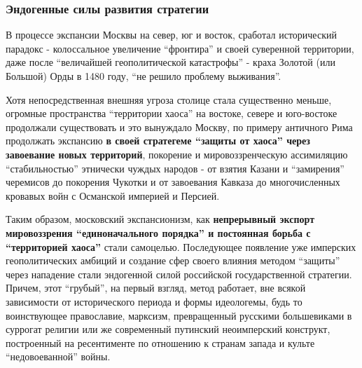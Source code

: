  
 
 
 
 

\subsubsection{Эндогенные силы развития стратегии}
\label{sec:16_01_2022.stz.news.ua.hvylya.1.anatomia_vraga.7.endogennye_sily_razvitia_strategii}

В процессе экспансии Москвы на север, юг и восток, сработал исторический
парадокс - колоссальное увеличение \enquote{фронтира} и своей суверенной территории,
даже после \enquote{величайшей геополитической катастрофы} - краха Золотой (или
Большой) Орды в 1480 году, \enquote{не решило проблему выживания}.

Хотя непосредственная внешняя угроза столице стала существенно меньше, огромные
пространства \enquote{территории хаоса} на востоке, севере и юго-востоке продолжали
существовать и это вынуждало Москву, по примеру античного Рима продолжать
экспансию \textbf{в своей стратегеме \enquote{защиты от хаоса} через завоевание новых
территорий}, покорение и мировоззренческую ассимиляцию \enquote{стабильностью} этнически
чуждых народов - от взятия Казани и \enquote{замирения} черемисов до покорения Чукотки
и от завоевания Кавказа до многочисленных кровавых войн с Османской империей и
Персией.

Таким образом, московский экспансионизм, как \textbf{непрерывный экспорт мировоззрения
\enquote{единоначального порядка} и постоянная борьба с \enquote{территорией хаоса}} стали
самоцелью. Последующее появление уже имперских геополитических амбиций и
создание сфер своего влияния методом \enquote{защиты} через нападение стали эндогенной
силой российской государственной стратегии. Причем, этот \enquote{грубый}, на первый
взгляд, метод работает, вне всякой зависимости от исторического периода и формы
идеологемы, будь то воинствующее православие, марксизм, превращенный русскими
большевиками в суррогат религии или же современный путинский неоимперский
конструкт, построенный на ресентименте по отношению к странам запада и культе
\enquote{недовоеванной} войны.
